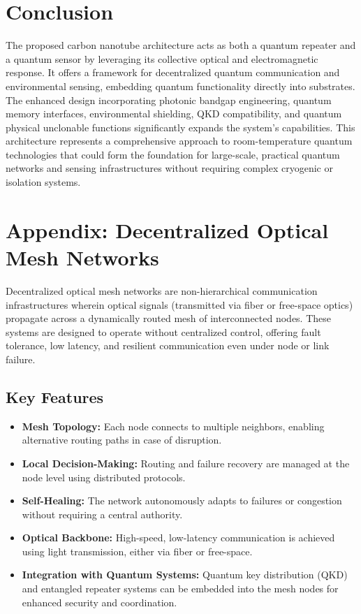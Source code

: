 \documentclass[11pt]{article}
\begin{document}
	\section{Conclusion}
	The proposed carbon nanotube architecture acts as both a quantum repeater and a quantum sensor by leveraging its collective optical and electromagnetic response. It offers a framework for decentralized quantum communication and environmental sensing, embedding quantum functionality directly into substrates. The enhanced design incorporating photonic bandgap engineering, quantum memory interfaces, environmental shielding, QKD compatibility, and quantum physical unclonable functions significantly expands the system's capabilities. This architecture represents a comprehensive approach to room-temperature quantum technologies that could form the foundation for large-scale, practical quantum networks and sensing infrastructures without requiring complex cryogenic or isolation systems.
	
	\section*{Appendix: Decentralized Optical Mesh Networks}
	Decentralized optical mesh networks are non-hierarchical communication infrastructures wherein optical signals (transmitted via fiber or free-space optics) propagate across a dynamically routed mesh of interconnected nodes. These systems are designed to operate without centralized control, offering fault tolerance, low latency, and resilient communication even under node or link failure.
	
	\subsection*{Key Features}
	\begin{itemize}
		\item \textbf{Mesh Topology:} Each node connects to multiple neighbors, enabling alternative routing paths in case of disruption.
		\item \textbf{Local Decision-Making:} Routing and failure recovery are managed at the node level using distributed protocols.
		\item \textbf{Self-Healing:} The network autonomously adapts to failures or congestion without requiring a central authority.
		\item \textbf{Optical Backbone:} High-speed, low-latency communication is achieved using light transmission, either via fiber or free-space.
		\item \textbf{Integration with Quantum Systems:} Quantum key distribution (QKD) and entangled repeater systems can be embedded into the mesh nodes for enhanced security and coordination.
	\end{itemize}
	
\end{document}

